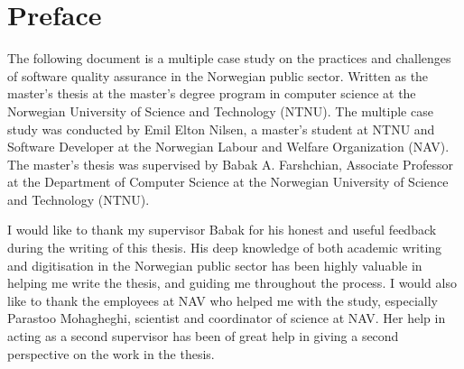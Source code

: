 \chapter*{Preface}
The following document is a multiple case study on the practices and challenges of software quality assurance in the Norwegian public sector. Written as the master's thesis at the master's degree program in computer science at the Norwegian University of Science and Technology (NTNU). The multiple case study was conducted by Emil Elton Nilsen, a master's student at NTNU and Software Developer at the Norwegian Labour and Welfare Organization (NAV). The master's thesis was supervised by Babak A. Farshchian, Associate Professor at the Department of Computer Science at the Norwegian University of Science and Technology (NTNU).

I would like to thank my supervisor Babak for his honest and useful feedback during the writing of this thesis. His deep knowledge of both academic writing and digitisation in the Norwegian public sector has been highly valuable in helping me write the thesis, and guiding me throughout the process. I would also like to thank the employees at NAV who helped me with the study, especially Parastoo Mohagheghi, scientist and coordinator of science at NAV. Her help in acting as a second supervisor has been of great help in giving a second perspective on the work in the thesis.